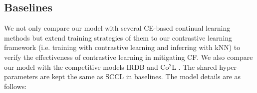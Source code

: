 


 \subsection{Baselines} We not only compare our model with several CE-based continual learning methods but extend training strategies of them to our contrastive learning framework (i.e. training with contrastive learning and inferring with kNN) to verify the effectiveness of contrastive learning in mitigating CF. We also compare our model with the competitive models IRDB \cite{huang2021continual} and Co$^2$L \cite{cha2021co2l}.  The shared hyper-parameters are kept the same as SCCL in baselines. The model details are as follows:


